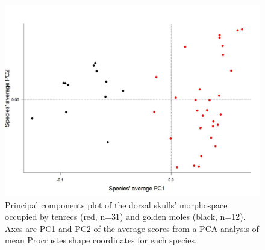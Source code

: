 \documentclass[12pt,a4paper]{article}
\begin{document}


\begin{figure}[H]
\centering
\includegraphics[width=1\linewidth]{figures/SkDors_Tenrecs+Gmoles_PC1PC2_01_05.jpg}
\caption{Principal components plot of the dorsal skulls' morphospace occupied by tenrecs (red, n=31) and golden moles (black, n=12). Axes are PC1 and PC2 of the average scores from a PCA analysis of mean Procrustes shape coordinates for each species. }
\label{fig:skdorsPCA}
\end{figure}
\end{document}
